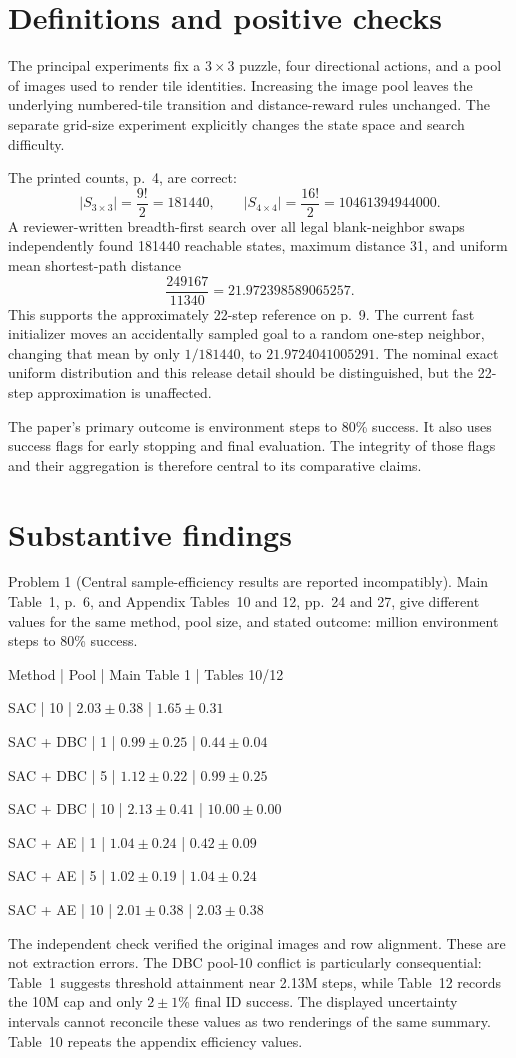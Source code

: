 \documentclass[10pt]{article}
\begin{document}
\section*{Definitions and positive checks}
The principal experiments fix a \(3\times3\) puzzle, four directional actions, and a pool of images used to render tile identities. Increasing the image pool leaves the underlying numbered-tile transition and distance-reward rules unchanged. The separate grid-size experiment explicitly changes the state space and search difficulty.\par
The printed counts, p. 4, are correct: \[|S_{3\times3}|=\frac{9!}{2}=181440,\qquad
 |S_{4\times4}|=\frac{16!}{2}=10461394944000.\] A reviewer-written breadth-first search over all legal blank-neighbor swaps independently found 181440 reachable states, maximum distance 31, and uniform mean shortest-path distance \[\frac{249167}{11340}=21.972398589065257.\] This supports the approximately 22-step reference on p. 9. The current fast initializer moves an accidentally sampled goal to a random one-step neighbor, changing that mean by only \(1/181440\), to \(21.9724041005291\). The nominal exact uniform distribution and this release detail should be distinguished, but the 22-step approximation is unaffected.\par
The paper’s primary outcome is environment steps to 80\% success. It also uses success flags for early stopping and final evaluation. The integrity of those flags and their aggregation is therefore central to its comparative claims.\par
\section*{Substantive findings}
Problem 1 (Central sample-efficiency results are reported incompatibly).  Main Table 1, p. 6, and Appendix Tables 10 and 12, pp. 24 and 27, give different values for the same method, pool size, and stated outcome: million environment steps to 80\% success.\par
Method | Pool | Main Table 1 | Tables 10/12\par
SAC | 10 | \(2.03\pm0.38\) | \(1.65\pm0.31\)\par
SAC + DBC | 1 | \(0.99\pm0.25\) | \(0.44\pm0.04\)\par
SAC + DBC | 5 | \(1.12\pm0.22\) | \(0.99\pm0.25\)\par
SAC + DBC | 10 | \(2.13\pm0.41\) | \(10.00\pm0.00\)\par
SAC + AE | 1 | \(1.04\pm0.24\) | \(0.42\pm0.09\)\par
SAC + AE | 5 | \(1.02\pm0.19\) | \(1.04\pm0.24\)\par
SAC + AE | 10 | \(2.01\pm0.38\) | \(2.03\pm0.38\)\par
The independent check verified the original images and row alignment. These are not extraction errors. The DBC pool-10 conflict is particularly consequential: Table 1 suggests threshold attainment near 2.13M steps, while Table 12 records the 10M cap and only \(2\pm1\)\% final ID success. The displayed uncertainty intervals cannot reconcile these values as two renderings of the same summary. Table 10 repeats the appendix efficiency values.\par
\end{document}
